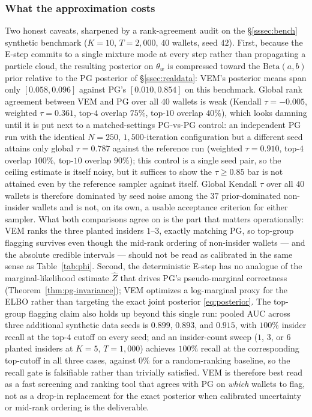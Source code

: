 \subsubsection{What the approximation costs}

Two honest caveats, sharpened by a rank-agreement audit on the \S\ref{sssec:bench} synthetic benchmark ($K=10$, $T=2{,}000$, $40$ wallets, seed $42$). First, because the E-step commits to a single mixture mode at every step rather than propagating a particle cloud, the resulting posterior on $\theta_w$ is compressed toward the $\mathrm{Beta}(a,b)$ prior relative to the PG posterior of \S\ref{ssec:realdata}: VEM's posterior means span only $[0.058, 0.096]$ against PG's $[0.010, 0.854]$ on this benchmark. Global rank agreement between VEM and PG over all $40$ wallets is weak (Kendall $\tau = -0.005$, weighted $\tau = 0.361$, top-$4$ overlap $75\%$, top-$10$ overlap $40\%$), which looks damning until it is put next to a matched-settings PG-vs-PG control: an independent PG run with the identical $N=250$, $1{,}500$-iteration configuration but a different seed attains only global $\tau = 0.787$ against the reference run (weighted $\tau = 0.910$, top-$4$ overlap $100\%$, top-$10$ overlap $90\%$); this control is a single seed pair, so the ceiling estimate is itself noisy, but it suffices to show the $\tau \ge 0.85$ bar is not attained even by the reference sampler against itself. Global Kendall $\tau$ over all $40$ wallets is therefore dominated by seed noise among the $37$ prior-dominated non-insider wallets and is not, on its own, a usable acceptance criterion for either sampler. What both comparisons agree on is the part that matters operationally: VEM ranks the three planted insiders $1$--$3$, exactly matching PG, so top-group flagging survives even though the mid-rank ordering of non-insider wallets --- and the absolute credible intervals --- should not be read as calibrated in the same sense as Table~\ref{tab:phi}. Second, the deterministic E-step has no analogue of the marginal-likelihood estimate $\widehat Z$ that drives PG's pseudo-marginal correctness (Theorem~\ref{thm:pg-invariance}); VEM optimizes a log-marginal proxy for the ELBO rather than targeting the exact joint posterior \eqref{eq:posterior}. The top-group flagging claim also holds up beyond this single run: pooled AUC across three additional synthetic data seeds is $0.899$, $0.893$, and $0.915$, with $100\%$ insider recall at the top-$4$ cutoff on every seed; and an insider-count sweep ($1$, $3$, or $6$ planted insiders at $K=5$, $T=1{,}000$) achieves $100\%$ recall at the corresponding top-cutoff in all three cases, against $0\%$ for a random-ranking baseline, so the recall gate is falsifiable rather than trivially satisfied. VEM is therefore best read as a fast screening and ranking tool that agrees with PG on \emph{which} wallets to flag, not as a drop-in replacement for the exact posterior when calibrated uncertainty or mid-rank ordering is the deliverable.

